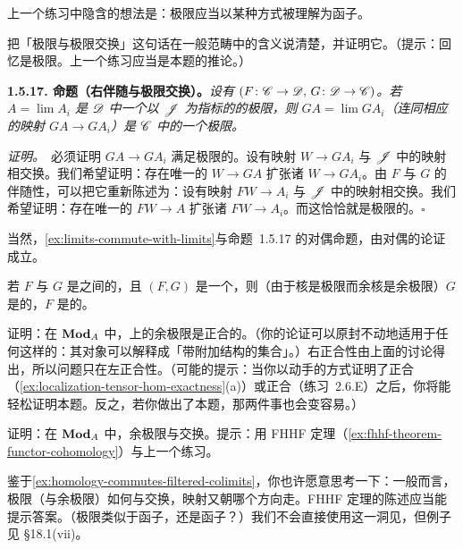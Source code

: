 上一个练习中隐含的想法是：极限应当以某种方式被理解为函子。

\begin{exercise}\label{ex:limits-commute-with-limits}
把「极限与极限交换」这句话在一般范畴中的含义说清楚，并证明它。（提示：回忆\trKernel{}是极限。上一个练习应当是本题的推论。）
\end{exercise}

\textbf{1.5.17. 命题（右伴随与极限交换）。}\quad \emph{设有\trAdjointPair{} $(F\colon\mathscr{C}\to\mathscr{D},\,G\colon\mathscr{D}\to\mathscr{C})$。若 $A=\lim A_i$ 是 $\mathscr{D}$ 中一个以 $\mathscr{J}$ 为指标的\trDiagram{}的极限，则 $GA=\lim GA_i$（连同相应的映射 $GA\to GA_i$）是 $\mathscr{C}$ 中的一个极限。}

\emph{证明。}\ 必须证明 $GA\to GA_i$ 满足极限的\trUniversalProperty。设有映射 $W\to GA_i$ 与 $\mathscr{J}$ 中的映射相交换。我们希望证明：存在唯一的 $W\to GA$ 扩张诸 $W\to GA_i$。由 $F$ 与 $G$ 的伴随性，可以把它重新陈述为：设有映射 $FW\to A_i$ 与 $\mathscr{J}$ 中的映射相交换。我们希望证明：存在唯一的 $FW\to A$ 扩张诸 $FW\to A_i$。而这恰恰就是极限的\trUniversalProperty。\hfill$\square$

当然，\cref{ex:limits-commute-with-limits}与命题~1.5.17 的对偶命题，由对偶的论证成立。

若 $F$ 与 $G$ 是\trAbelianCategory{}之间的\trAdditiveFunctor，且 $(F,G)$ 是一个\trAdjointPair，则（由于核是极限而余核是余极限）$G$ 是\trLeftExact{}的，$F$ 是\trRightExact{}的。

\begin{exercise}\label{ex:filtered-colimits-exactness}
证明：在 $\mathbf{Mod}_{A}$ 中，\trFiltered{}\trIndexCategory{}上的余极限是正合的。（你的论证可以原封不动地适用于任何这样的\trAbelianCategory：其对象可以解释成「带附加结构的集合」。）右正合性由上面的讨论得出，所以问题只在左正合性。（可能的提示：当你以动手的方式证明了\trLocalization{}正合（\cref{ex:localization-tensor-hom-exactness}(a)）或\trStalkification{}正合（练习~2.6.E）之后，你将能轻松证明本题。反之，若你做出了本题，那两件事也会变容易。）
\end{exercise}

\begin{exercise}\label{ex:homology-commutes-filtered-colimits}
证明：在 $\mathbf{Mod}_{A}$ 中，\trFiltered{}余极限与\trHomology{}交换。提示：用 FHHF 定理（\cref{ex:fhhf-theorem-functor-cohomology}）与上一个练习。
\end{exercise}

鉴于\cref{ex:homology-commutes-filtered-colimits}，你也许愿意思考一下：一般而言，极限（与余极限）如何与\trHomology{}交换，映射又朝哪个方向走。FHHF 定理的陈述应当能提示答案。（极限类似于\trLeftExact{}函子，还是\trRightExact{}函子？）我们不会直接使用这一洞见，但例子见 \S18.1(vii)。

